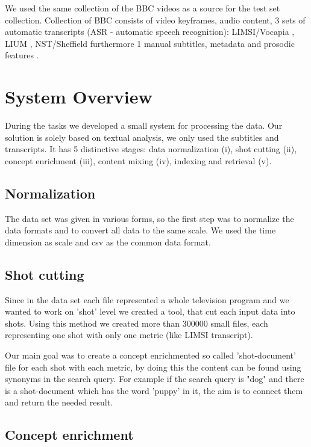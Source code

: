 \documentclass{acm_proc_article-me}
\begin{document}
We used the same collection of the BBC videos as a source for the test set collection. Collection of BBC consists of video keyframes, audio content, 3 sets of automatic transcripts (ASR - automatic speech recognition): LIMSI/Vocapia \cite{gauvain2002limsi,lamel2012multilingual}, LIUM \cite{8307} , NST/Sheffield \cite{lanchantin2013automatic,hain2008automatic} furthermore 1 manual subtitles, metadata and prosodic features \cite{eyben2013recent}.


\section{System Overview}

During the tasks we developed a small system for processing the data. Our solution is solely based on textual analysis, we only used the subtitles and transcripts. It has 5 distinctive stages: data normalization (i), shot cutting (ii), concept enrichment (iii), content mixing (iv), indexing and retrieval (v).


\subsection{Normalization}
The data set was given in various forms, so the first step was to normalize the data formats and to convert all data to the same scale. We used the time dimension as scale and csv as the common data format.

\subsection{Shot cutting}

Since in the data set each file represented a whole television program and we wanted to work on 'shot' level we created a tool, that cut each input data into shots. Using this method we created more than 300000 small files, each representing one shot with only one metric (like LIMSI transcript).

Our main goal was to create a concept enrichmented so called 'shot-document' file for each shot with each metric, by doing this the content can be found using synonyms in the search query. For example if the search query is "dog" and there is a shot-document which has the word 'puppy' in it, the aim is to connect them and return the needed result.

\subsection{Concept enrichment}
\end{document}
